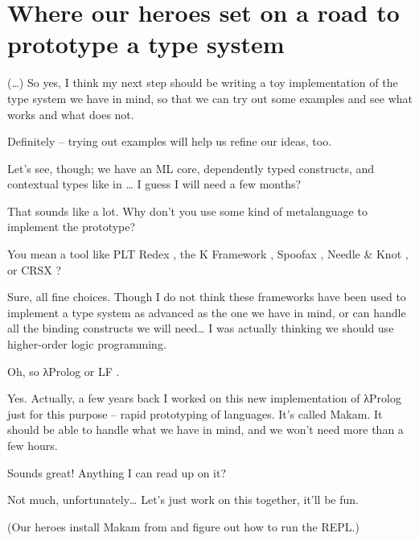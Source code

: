 \section{Where our heroes set on a road to prototype a type
system}\label{where-our-heroes-set-on-a-road-to-prototype-a-type-system}

\heroSTUDENT{} (\ldots{}) So yes, I think my next step should be writing a toy
implementation of the type system we have in mind, so that we can try
out some examples and see what works and what does not.

\heroADVISOR{} Definitely -- trying out examples will help us refine our
ideas, too.

\heroSTUDENT{} Let's see, though; we have an ML core, dependently typed
constructs, and contextual types like in
\citet{nanevski2008contextual}\ldots{} I guess I will need a few months?

\heroADVISOR{} That sounds like a lot. Why don't you use some kind of
metalanguage to implement the prototype?

\heroSTUDENT{} You mean a tool like PLT Redex \citep{felleisen2009semantics},
the K Framework \citep{rosu2010overview,ellison2009rewriting}, Spoofax
\citep{kats2010spoofax}, Needle \& Knot \citep{keuchel2016needle}, or
CRSX \citep{rose2011crsx}?

\heroADVISOR{} Sure, all fine choices. Though I do not think these frameworks
have been used to implement a type system as advanced as the one we have
in mind, or can handle all the binding constructs we will need\ldots{} I
was actually thinking we should use higher-order logic programming.

\heroSTUDENT{} Oh, so \foreignlanguage{greek}{λ}Prolog \citep{miller1988overview} or LF
\citep{pfenning1999system}.

\heroADVISOR{} Yes. Actually, a few years back I worked on this new
implementation of \foreignlanguage{greek}{λ}Prolog just for this purpose -- rapid prototyping of
languages. It's called Makam. It should be able to handle what we have
in mind, and we won't need more than a few hours.

\heroSTUDENT{} Sounds great! Anything I can read up on it?

\heroADVISOR{} Not much, unfortunately\ldots{} Let's just work on this
together, it'll be fun.

\begin{scenecomment}
(Our heroes install Makam from
\fi\xspace
and figure out how to run the REPL.)
\end{scenecomment}
